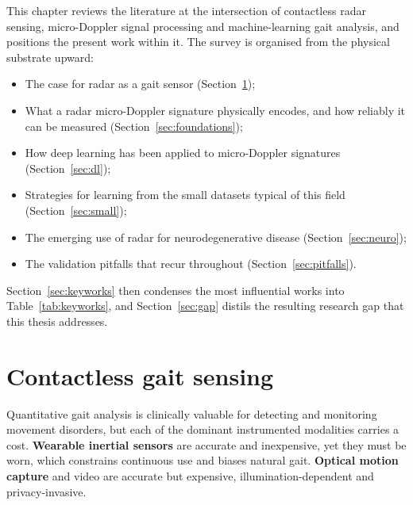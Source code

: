 
This chapter reviews the literature at the intersection of contactless radar
sensing, micro-Doppler signal processing and machine-learning gait analysis, and
positions the present work within it. The survey is organised from the physical
substrate upward:

\begin{itemize}
  \item The case for radar as a gait sensor (Section~\ref{sec:contactless});
  \item What a radar micro-Doppler signature physically encodes, and how reliably
        it can be measured (Section~\ref{sec:foundations});
  \item How deep learning has been applied to micro-Doppler signatures
        (Section~\ref{sec:dl});
  \item Strategies for learning from the small datasets typical of this field
        (Section~\ref{sec:small});
  \item The emerging use of radar for neurodegenerative disease
        (Section~\ref{sec:neuro});
  \item The validation pitfalls that recur throughout
        (Section~\ref{sec:pitfalls}).
\end{itemize}

\noindent Section~\ref{sec:keyworks} then condenses the most influential
works into Table~\ref{tab:keyworks}, and Section~\ref{sec:gap} distils the
resulting research gap that this thesis addresses.

\section{Contactless gait sensing}
\label{sec:contactless}

Quantitative gait analysis is clinically valuable for detecting and monitoring
movement disorders, but each of the dominant instrumented modalities carries a
cost. \textbf{Wearable inertial sensors} are accurate and inexpensive, yet they
must be worn, which constrains continuous use and biases natural gait.
\textbf{Optical motion capture} and video are accurate but expensive,
illumination-dependent and privacy-invasive.

